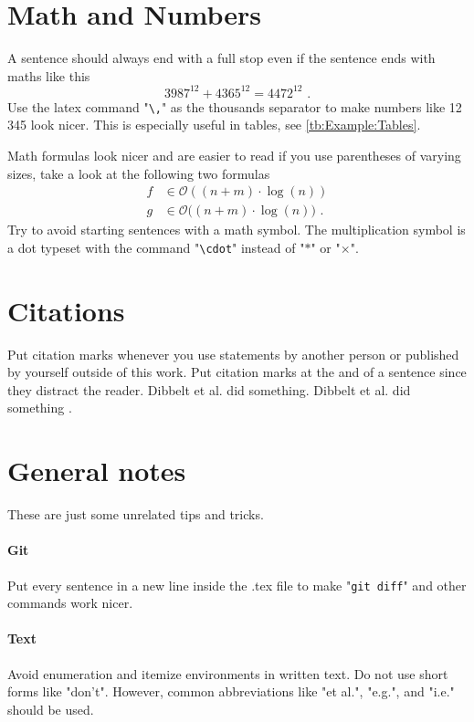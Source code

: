 \section{Math and Numbers}
\label{sec:Example:MathAndNumbers}
A sentence should always end with a full stop even if the sentence ends with maths like this
\[3987^{12}+4365^{12}=4472^{12}\text{~.}\]
Use the latex command "\texttt{\textbackslash,}" as the thousands separator to make numbers like 12\,345 look nicer.
This is especially useful in tables, see \cref{tb:Example:Tables}.

Math formulas look nicer and are easier to read if you use parentheses of varying sizes, take a look at the following two formulas
\begin{align*}
	f&\in\mathcal{O}((n+m)\cdot\log(n))\\
	g&\in\mathcal{O}\big((n+m)\cdot\log(n)\big)\text{~.}
\end{align*}
Try to avoid starting sentences with a math symbol.
The multiplication symbol is a dot typeset with the command "\texttt{\textbackslash{}cdot}" instead of "$*$" or "$\times$".


\section{Citations}
\label{sec:Example:Citations}
Put citation marks whenever you use statements by another person or published by yourself outside of this work.
Put citation marks at the and of a sentence since they distract the reader.
Dibbelt et al. \cite{DSW16} did something.
Dibbelt et al. did something \cite{DSW16}.


\section{General notes}
\label{sec:Example:Notes}
These are just some unrelated tips and tricks.

\paragraph{Git}
Put every sentence in a new line inside the .tex file to make "\texttt{git diff}" and other commands work nicer.

\paragraph{Text}
Avoid enumeration and itemize environments in written text.
Do not use short forms like "don't".
However, common abbreviations like "et al.", "e.g.", and "i.e." should be used.

